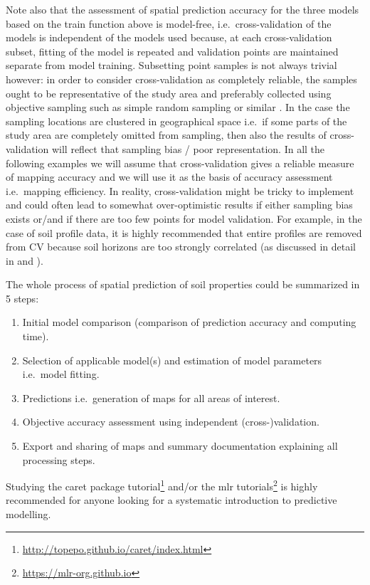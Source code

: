 \documentclass[11pt]{krantz}
\providecommand{\tightlist}{%
  \setlength{\itemsep}{0pt}\setlength{\parskip}{0pt}}
\renewcommand{\href}[2]{#2\footnote{\url{#1}}}
\theoremstyle{definition}
\theoremstyle{definition}
\theoremstyle{definition}
\theoremstyle{remark}
\begin{document}
Note also that the assessment of spatial prediction accuracy for the
three models based on the train function above is model-free,
i.e.~cross-validation of the models is independent of the models used
because, at each cross-validation subset, fitting of the model is
repeated and validation points are maintained separate from model
training. Subsetting point samples is not always trivial however: in
order to consider cross-validation as completely reliable, the samples
ought to be representative of the study area and preferably collected
using objective sampling such as simple random sampling or similar
\citep{Brus2011EJSS}. In the case the sampling locations are clustered
in geographical space i.e.~if some parts of the study area are
completely omitted from sampling, then also the results of
cross-validation will reflect that sampling bias / poor representation.
In all the following examples we will assume that cross-validation gives
a reliable measure of mapping accuracy and we will use it as the basis
of accuracy assessment i.e.~mapping efficiency. In reality,
cross-validation might be tricky to implement and could often lead to
somewhat over-optimistic results if either sampling bias exists or/and
if there are too few points for model validation. For example, in the
case of soil profile data, it is highly recommended that entire profiles
are removed from CV because soil horizons are too strongly correlated
(as discussed in detail in \citet{Gasch2015SPASTA} and
\citet{Brenning2012}).

The whole process of spatial prediction of soil properties could be
summarized in 5 steps:

\begin{enumerate}
\def\labelenumi{\arabic{enumi}.}
\tightlist
\item
  Initial model comparison (comparison of prediction accuracy and
  computing time).
\item
  Selection of applicable model(s) and estimation of model parameters
  i.e.~model fitting.
\item
  Predictions i.e.~generation of maps for all areas of interest.
\item
  Objective accuracy assessment using independent (cross-)validation.
\item
  Export and sharing of maps and summary documentation explaining all
  processing steps.
\end{enumerate}

Studying the \href{http://topepo.github.io/caret/index.html}{caret
package tutorial} and/or the \href{https://mlr-org.github.io}{mlr
tutorials} is highly recommended for anyone looking for a systematic
introduction to predictive modelling.
\end{document}
